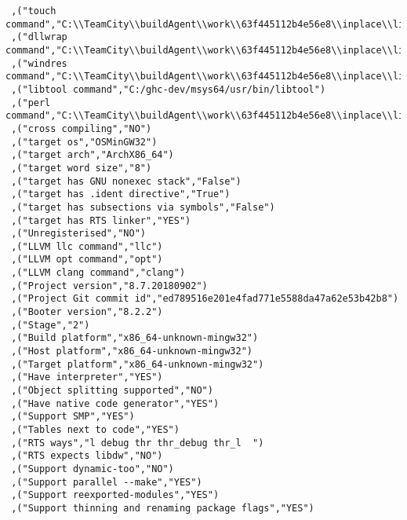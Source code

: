 \begin{verbatim}
 ,("touch command","C:\\TeamCity\\buildAgent\\work\\63f445112b4e56e8\\inplace\\lib/bin/touchy.exe")
 ,("dllwrap command","C:\\TeamCity\\buildAgent\\work\\63f445112b4e56e8\\inplace\\lib\\../mingw/bin/dllwrap.exe")
 ,("windres command","C:\\TeamCity\\buildAgent\\work\\63f445112b4e56e8\\inplace\\lib\\../mingw/bin/windres.exe")
 ,("libtool command","C:/ghc-dev/msys64/usr/bin/libtool")
 ,("perl command","C:\\TeamCity\\buildAgent\\work\\63f445112b4e56e8\\inplace\\lib\\../perl/perl.exe")
 ,("cross compiling","NO")
 ,("target os","OSMinGW32")
 ,("target arch","ArchX86_64")
 ,("target word size","8")
 ,("target has GNU nonexec stack","False")
 ,("target has .ident directive","True")
 ,("target has subsections via symbols","False")
 ,("target has RTS linker","YES")
 ,("Unregisterised","NO")
 ,("LLVM llc command","llc")
 ,("LLVM opt command","opt")
 ,("LLVM clang command","clang")
 ,("Project version","8.7.20180902")
 ,("Project Git commit id","ed789516e201e4fad771e5588da47a62e53b42b8")
 ,("Booter version","8.2.2")
 ,("Stage","2")
 ,("Build platform","x86_64-unknown-mingw32")
 ,("Host platform","x86_64-unknown-mingw32")
 ,("Target platform","x86_64-unknown-mingw32")
 ,("Have interpreter","YES")
 ,("Object splitting supported","NO")
 ,("Have native code generator","YES")
 ,("Support SMP","YES")
 ,("Tables next to code","YES")
 ,("RTS ways","l debug thr thr_debug thr_l  ")
 ,("RTS expects libdw","NO")
 ,("Support dynamic-too","NO")
 ,("Support parallel --make","YES")
 ,("Support reexported-modules","YES")
 ,("Support thinning and renaming package flags","YES")

\end{verbatim}
